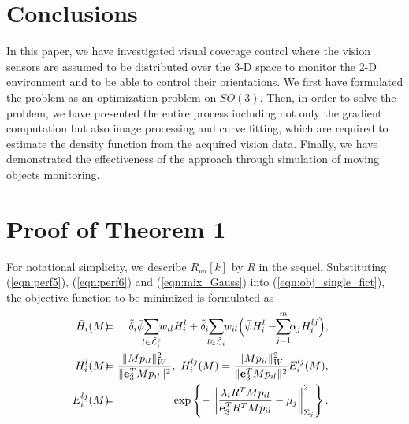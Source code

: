 \documentclass[conference,letterpaper]{ieeeconf}
\newcommand{\ewi}{R_{wi}}
\renewcommand{\L}{{\cal L}}
\begin{document}
\section{Conclusions}


In this paper, we have investigated visual coverage control 
where the vision sensors
are assumed to be distributed over the 3-D space to 
monitor the 2-D environment
and to be able to control their orientations.
We first have formulated the problem as an optimization
problem on $SO(3)$.
Then, in order to solve the problem, we have presented
the entire process including not only the gradient computation
but also image processing and curve fitting, which are 
required to estimate the density function
from the acquired vision data.
Finally, we have demonstrated the effectiveness of the approach
through simulation of moving objects monitoring.

\appendix


\section{Proof of Theorem 1}
\label{app:1}



For notational simplicity, we describe $\ewi[k]$ by $R$ in the sequel.
Substituting (\ref{eqn:perf5}), (\ref{eqn:perf6}) and (\ref{eqn:mix_Gauss})
into (\ref{eqn:obj_single_fict}), the objective function to be minimized
is formulated as
\begin{eqnarray}
\!\!\!\!\! \bar H_i(M) \!\!&\!\!=\!\!&\!\! 
\tilde \delta_i \bar{\phi} \!\!
\sum_{l \in \tilde \L_i^c}\!\!w_{il}H_i^l+
\tilde \delta_i 
\!\!\sum_{l \in \tilde \L_i}\!\!w_{il}
\Big( \bar \psi H_i^l - \!\!
\sum_{j=1}^m \!\! \alpha_j H_i^{lj}\Big),
\label{eqn:obj_single_fict3}\\
\!\!\!\!\! H_i^l(M) \!\!&\!\!=\!\!&\!\!  \frac{ \|Mp_{il}\|_W^2}{\|{\bf e}_3^T M p_{il}\|^2},\
H_i^{lj}(M) =
\frac{\|Mp_{il}\|_W^2}{\|{\bf e}_3^T M p_{il}\|^2}
E_i^{lj}(M),
\nonumber\\
\!\!\!\!\! E_i^{lj}(M) \!\!&\!\!=\!\!&\!\!
\exp\left\{-
\left\|
\frac{\lambda_i R^T Mp_{il}}
{{\bf e}_3^T R^T Mp_{il}}
- \mu_j \right\|^2_{\Sigma_j}
\right\}.
\nonumber
\end{eqnarray}
\end{document}
